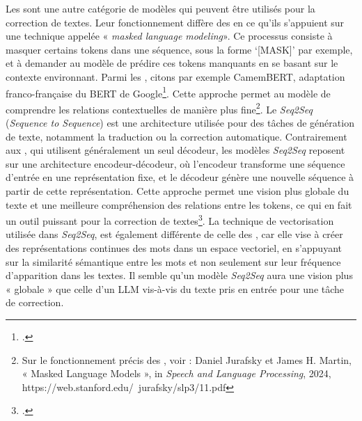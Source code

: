 \newline

Les \mlm sont une autre catégorie de modèles qui peuvent être utilisés pour la correction de textes. Leur fonctionnement diffère des \llm en ce qu’ils s’appuient sur une technique appelée « \textit{masked language modeling}». Ce processus consiste à masquer certains tokens dans une séquence, sous la forme ‘[MASK]’ par exemple, et à demander au modèle de prédire ces tokens manquants en se basant sur le contexte environnant. Parmi les \mlm, citons par exemple CamemBERT, adaptation franco-française du BERT de Google\footcite{martin_camembert_2020}.   Cette approche permet au modèle de comprendre les relations contextuelles de manière plus fine\footnote{Sur le fonctionnement précis des \mlm, voir : Daniel Jurafsky et James H. Martin, « Masked Language Models », in \textit{Speech and Language Processing}, 2024, https://web.stanford.edu/~jurafsky/slp3/11.pdf}.   
Le \textit{Seq2Seq} (\textit{Sequence to Sequence}) est une architecture utilisée pour des tâches de génération de texte, notamment la traduction ou la correction automatique. Contrairement aux \llm, qui utilisent généralement un seul décodeur, les modèles \textit{Seq2Seq} reposent sur une architecture encodeur-décodeur, où l’encodeur transforme une séquence d'entrée en une représentation fixe, et le décodeur génère une nouvelle séquence à partir de cette représentation. Cette approche permet une vision plus globale du texte et une meilleure compréhension des relations entre les tokens, ce qui en fait un outil puissant pour la correction de textes\footcite{sutskever_sequence_2014}. La technique de vectorisation utilisée dans \textit{Seq2Seq}, est également différente de celle des \llm, car elle vise à créer des représentations continues des mots dans un espace vectoriel, en s’appuyant sur la similarité sémantique entre les mots et non seulement sur leur fréquence d'apparition dans les textes. Il semble qu’un modèle \textit{Seq2Seq} aura une vision plus « globale » que celle d’un LLM vis-à-vis du texte pris en entrée pour une tâche de correction. 